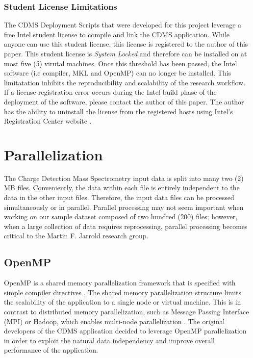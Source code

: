 \documentclass[9pt,twocolumn,twoside]{../../styles/osajnl}
\begin{document}
\subsubsection{Student License Limitations} \label{student-license}
The CDMS Deployment Scripts that were developed for this project
leverage a free Intel student license to compile and link the CDMS
application. While anyone can use this student license, this license
is registered to the author of this paper. This student license is
\emph{System Locked} and therefore can be installed on at most five
(5) virutal machines. Once this threshold has been passed, the Intel
software (i.e compiler, MKL and OpenMP) can no longer be
installed. This limitatation inhibits the reproducibility and
scalability of the research workflow. If a license registration error
occurs during the Intel build phase of the deployment of the software,
please contact the author of this paper. The author has the ability to
uninstall the license from the registered hosts using Intel's
Registration Center website \cite{intel-reg}.

\section{Parallelization} \label{parallel}
The Charge Detection Mass Spectrometry input data is split into many
two (2) MB files. Conveniently, the data within each file is entirely
independent to the data in the other input files. Therefore, the input
data files can be processed simultaneously or in parallel. Parallel
processing may not seem important when working on our sample dataset
composed of two hundred (200) files; however, when a large collection
of data requires reprocessing, parallel processing becomes critical to
the Martin F. Jarrold research group.
\subsection{OpenMP}
OpenMP is a shared memory parallelization framework that is specified
with simple compiler directives \cite{openmp}. The shared memory
parallelization structure limits the scalability of the application to
a single node or virtual machine. This is in contrast to distributed
memory parallelization, such as Message Passing Interface (MPI) or
Hadoop, which enables multi-node parallelization \cite{mpi,
  hadoop}. The original developers of the CDMS application decided to
leverage OpenMP parallelization in order to exploit the natural data
independency and improve overall performance of the application.
\end{document}
